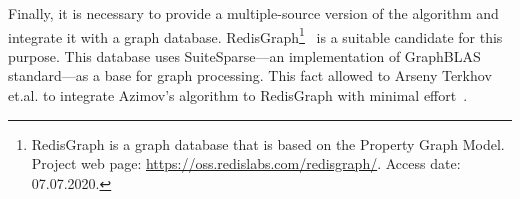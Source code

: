Finally, it is necessary to provide a multiple-source version of the algorithm and integrate it with a graph database.
RedisGraph\footnote{RedisGraph is a graph database that is based on the Property Graph
Model. Project web page: \url{https://oss.redislabs.com/redisgraph/}. Access date:
07.07.2020.}~\cite{8778293} is a suitable candidate for this purpose.
This database uses SuiteSparse---an implementation of GraphBLAS standard---as a base for graph processing.
This fact allowed to Arseny Terkhov et.al.  to integrate Azimov's algorithm to RedisGraph with minimal effort~\cite{10.1145/3398682.3399163}.
